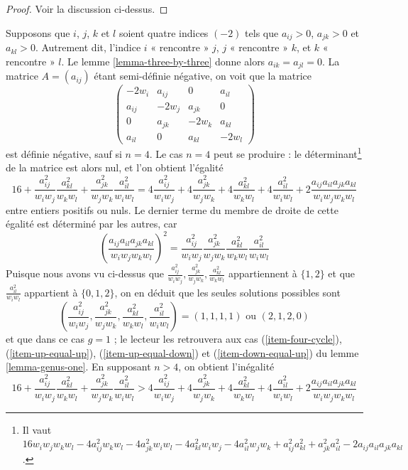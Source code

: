 \begin{proof}
Voir la discussion ci-dessus.
\end{proof}

\noindent
Supposons que $i$, $j$, $k$ et $l$ soient quatre indices $(-2)$ tels que
$a_{ij} > 0$, $a_{jk} > 0$ et $a_{kl} > 0$. Autrement dit,
l'indice $i$ « rencontre » $j$, $j$ « rencontre » $k$, et $k$ « rencontre » $l$.
Le lemme \ref{lemma-three-by-three} donne alors $a_{ik} = a_{jl} = 0$.
La matrice $A = (a_{ij})$ étant semi-définie négative, on voit que la
matrice
$$
\left(
\begin{matrix}
-2w_i & a_{ij} & 0 & a_{il} \\
a_{ij} & -2w_j & a_{jk} & 0 \\
0 & a_{jk} & -2w_k & a_{kl} \\
a_{il} & 0 & a_{kl} & -2w_l
\end{matrix}
\right)
$$
est définie négative, sauf si $n = 4$. Le cas $n = 4$ peut se produire :
le déterminant\footnote{Il vaut
$16w_iw_jw_kw_l - 4a_{ij}^2w_kw_l - 4a_{jk}^2w_iw_l - 4a_{kl}^2w_iw_j -
4a_{il}^2w_jw_k + a_{ij}^2a_{kl}^2 + a_{jk}^2a_{il}^2 -
2a_{ij}a_{il}a_{jk}a_{kl}$.} de la matrice est alors nul, et l'on obtient l'égalité
$$
16 +
\frac{a_{ij}^2}{w_iw_j}\frac{a_{kl}^2}{w_kw_l} +
\frac{a_{jk}^2}{w_jw_k}\frac{a_{il}^2}{w_iw_l} =
4\frac{a_{ij}^2}{w_iw_j} + 4\frac{a_{jk}^2}{w_jw_k} + 4\frac{a_{kl}^2}{w_kw_l}
+ 4\frac{a_{il}^2}{w_iw_l} + 2\frac{a_{ij}a_{il}a_{jk}a_{kl}}{w_iw_jw_kw_l}
$$
entre entiers positifs ou nuls. Le dernier terme du membre de droite de cette égalité est
déterminé par les autres, car
$$
\left(\frac{a_{ij}a_{il}a_{jk}a_{kl}}{w_iw_jw_kw_l}\right)^2 =
\frac{a_{ij}^2}{w_iw_j} \frac{a_{jk}^2}{w_jw_k}
\frac{a_{kl}^2}{w_kw_l} \frac{a_{il}^2}{w_iw_l}
$$
Puisque nous avons vu ci-dessus que
$\frac{a_{ij}^2}{w_iw_j}, \frac{a_{jk}^2}{w_jw_k}, \frac{a_{kl}^2}{w_kw_l}$
appartiennent à $\{1, 2\}$ et que $\frac{a_{il}^2}{w_iw_l}$ appartient à $\{0, 1, 2\}$,
on en déduit que les seules solutions possibles sont
$$
(\frac{a_{ij}^2}{w_iw_j}, \frac{a_{jk}^2}{w_jw_k}, \frac{a_{kl}^2}{w_kw_l},
\frac{a_{il}^2}{w_iw_l}) =
(1, 1, 1, 1) \text{ ou } (2, 1, 2, 0)
$$
et que dans ce cas $g = 1$ ; le lecteur les retrouvera aux cas
(\ref{item-four-cycle}), (\ref{item-up-equal-up}),
(\ref{item-up-equal-down}) et (\ref{item-down-equal-up})
du lemme \ref{lemma-genus-one}. En supposant $n > 4$,
on obtient l'inégalité
$$
16 +
\frac{a_{ij}^2}{w_iw_j}\frac{a_{kl}^2}{w_kw_l} +
\frac{a_{jk}^2}{w_jw_k}\frac{a_{il}^2}{w_iw_l} >
4\frac{a_{ij}^2}{w_iw_j} + 4\frac{a_{jk}^2}{w_jw_k} + 4\frac{a_{kl}^2}{w_kw_l}
+ 4\frac{a_{il}^2}{w_iw_l} + 2\frac{a_{ij}a_{il}a_{jk}a_{kl}}{w_iw_jw_kw_l}
$$
